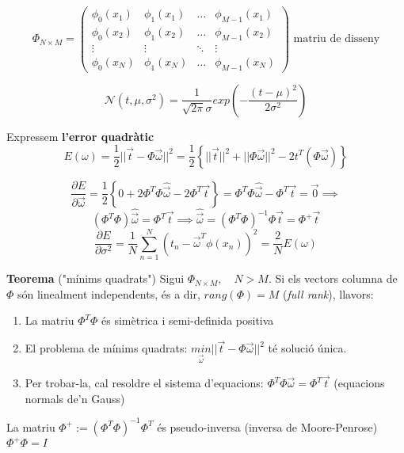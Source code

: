 \documentclass[a4paper]{article}
\begin{document}
$$
\Phi_{N \times M} =
\begin{pmatrix}
\phi_0 (x_1) & \phi_1(x_1) & \ldots & \phi_{M-1} (x_1) \\
\phi_0 (x_2) & \phi_1(x_2) & \ldots & \phi_{M-1} (x_2) \\
\vdots & \vdots & \ddots & \vdots \\
\phi_0 (x_N) & \phi_1(x_N) & \ldots & \phi_{M-1} (x_N)
\end{pmatrix}
\text{ matriu de disseny}
$$

$$
\mathcal{N}(t, \mu, \sigma^2) = \frac{1}{\sqrt{2 \pi} \sigma} exp \left( - \frac{(t - \mu)^2}{2\sigma^2} \right)
$$

Expressem \textbf{l'error quadràtic}
$$
E(\omega) = \frac{1}{2} || \vec{t} - \Phi \vec{\omega} ||^2 = \frac{1}{2} \left\{ ||\vec{t}||^2 + ||\Phi \vec{\omega}||^2 - 2t^T(\Phi \vec{\omega}) \right\}
$$

$$
\frac{\partial E}{\partial \vec{\omega}} = \frac{1}{2} \left\{ 0 + 2 \Phi^T \Phi \hat{\vec{\omega}} - 2 \Phi^T \vec{t} \right\} = \Phi^T \Phi \hat{\vec{\omega}} - \Phi^T \vec{t} = \vec{0} \implies
$$
$$
\left( \Phi^T \Phi \right) \hat{\vec{\omega}} = \Phi^T \vec{t} \implies
\boxed{\hat{\vec{\omega}} = (\Phi^T \Phi)^{-1} \Phi \vec{t}} = \Phi^+ \vec{t}
$$
$$
\frac{\partial E}{\partial \sigma^2} = \frac{1}{N} \sum_{n=1}^N (t_n - \vec{\omega}^T \phi(x_n))^2 = \frac{2}{N} E(\omega)
$$

\textbf{Teorema} ("mínims quadrats")
Sigui $\Phi_{N\times M}, \quad N > M$. Si els vectors columna de $\Phi$ són linealment independents, és a dir, $rang(\Phi) = M$ (\emph{full rank}), llavors:

\begin{enumerate}
	\item La matriu $\Phi^T\Phi$ és simètrica i semi-definida positiva
	\item El problema de mínims quadrats: 
	$\underset{\vec{\omega}}{min} ||\vec{t} - \Phi \vec{\omega}||^2$ té solució única.
	\item Per trobar-la, cal resoldre el sistema d'equacions: $\Phi^T\Phi \vec{\omega} = \Phi^T \vec{t}$ (equacions normals de'n Gauss)
\end{enumerate}

La matriu $ \Phi^+ := \left( \Phi^T \Phi \right)^{-1} \Phi^T $ és pseudo-inversa (inversa de Moore-Penrose) $ \Phi^+ \Phi = I $
\end{document}

